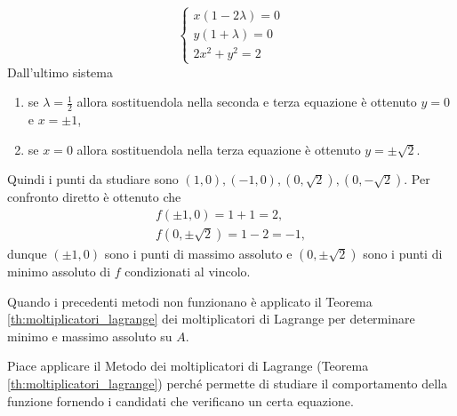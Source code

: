 \begin{example}
\begin{equation*}
		\begin{cases}
			x(1-2\lambda) = 0 \\
			y(1+\lambda) = 0\\
			2x^2 + y^2 = 2
		\end{cases}
	\end{equation*}
	Dall'ultimo sistema
	\begin{enumerate}
		\item se $\lambda = \frac{1}{2}$ allora sostituendola nella seconda e terza equazione è ottenuto $y=0$ e $x = \pm 1$,
		\item se $x=0$ allora sostituendola nella terza equazione è ottenuto $y=\pm\sqrt{2}$.
	\end{enumerate}
	Quindi i punti da studiare sono $(1, 0), (-1,0),(0,\sqrt{2}),(0,-\sqrt{2})$. Per confronto diretto è ottenuto che
	\begin{equation*}
		\begin{matrix}
			f(\pm 1, 0) = 1+1 = 2,\\
			f(0,\pm \sqrt{2}) = 1 -2 = -1,
		\end{matrix}
	\end{equation*}
	dunque $(\pm 1, 0)$ sono i punti di massimo assoluto e $(0,\pm\sqrt{2})$ sono i punti di minimo assoluto di $f$ condizionati al vincolo.
\end{example}


Quando i precedenti metodi non funzionano è applicato il Teorema \ref{th:moltiplicatori_lagrange} dei moltiplicatori di Lagrange per determinare minimo e massimo assoluto su $A$.

Piace applicare il Metodo dei moltiplicatori di Lagrange (Teorema \ref{th:moltiplicatori_lagrange}) perché permette di studiare il comportamento della funzione fornendo i candidati che verificano un certa equazione.

